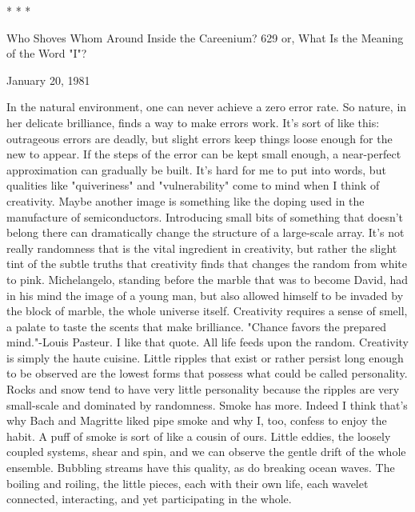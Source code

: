                                        *    *       *




Who Shoves Whom Around Inside the Careenium?                                           629
or, What Is the Meaning of the Word "I"?

                                                                    January 20, 1981

     In the natural environment, one can never achieve a zero error rate. So
  nature, in her delicate brilliance, finds a way to make errors work. It's sort of
  like this: outrageous errors are deadly, but slight errors keep things loose
  enough for the new to appear. If the steps of the error can be kept small enough,
  a near-perfect approximation can gradually be built.
     It's hard for me to put into words, but qualities like "quiveriness" and
  "vulnerability" come to mind when I think of creativity. Maybe another image is
  something like the doping used in the manufacture of semiconductors.
  Introducing small bits of something that doesn't belong there can dramatically
  change the structure of a large-scale array. It's not really randomness that is the
  vital ingredient in creativity, but rather the slight tint of the subtle truths that
  creativity finds that changes the random from white to pink. Michelangelo,
  standing before the marble that was to become David, had in his mind the image
  of a young man, but also allowed himself to be invaded by the block of marble,
  the whole universe itself. Creativity requires a sense of smell, a palate to taste
  the scents that make brilliance.
     "Chance favors the prepared mind."-Louis Pasteur. I like that quote. All life
  feeds upon the random. Creativity is simply the haute cuisine.
     Little ripples that exist or rather persist long enough to be observed are the
  lowest forms that possess what could be called personality. Rocks and snow
  tend to have very little personality because the ripples are very small-scale and
  dominated by randomness. Smoke has more. Indeed I think that's why Bach and
  Magritte liked pipe smoke and why I, too, confess to enjoy the habit.
     A puff of smoke is sort of like a cousin of ours. Little eddies, the loosely
  coupled systems, shear and spin, and we can observe the gentle drift of the
  whole ensemble. Bubbling streams have this quality, as do breaking ocean
  waves. The boiling and roiling, the little pieces, each with their own life, each
  wavelet connected, interacting, and yet participating in the whole.

